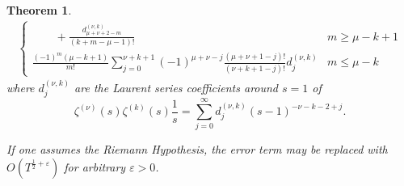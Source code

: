 \documentclass[10pt,a4paper]{amsart}
\newtheorem{theorem}{Theorem}
\begin{document}
\begin{theorem}
\begin{multline*}
\begin{cases}
\displaystyle \qquad  +\frac{d_{\mu+\nu+2-m}^{(\nu,k)}}{(k+m-\mu-1)!} & m \geq \mu-k+1 \\[3ex]
\displaystyle  \frac{(-1)^m(\mu-k+1)}{m!} \sum_{j=0}^{\nu+k+1} (-1)^{\mu+\nu-j}  \frac{(\mu+\nu+1-j)!}{(\nu+k+1-j)!} d_{j}^{(\nu,k)}  & m \leq \mu-k
\end{cases}
\end{multline*}
where $d_{j}^{(\nu,k)}$ are the Laurent series coefficients around $s=1$ of 
    \begin{equation*}
        \zeta^{(\nu)}(s)\zeta^{(k)}(s)\frac{1}{s}=\sum_{j=0}^{\infty}d_{j}^{(\nu,k)}(s-1)^{-\nu-k-2+j}.
    \end{equation*}

If one assumes the Riemann Hypothesis, the error term may be replaced with $O\left(T^{\frac{1}{2}+\varepsilon}\right)$ for arbitrary $\varepsilon>0$.
\end{theorem}
\end{document}
